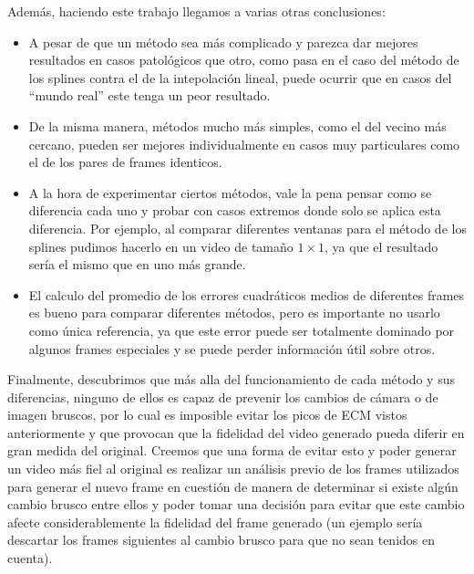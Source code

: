 \vspace{1em}

Adem\'as, haciendo este trabajo llegamos a varias otras conclusiones:

\vspace{-2ex}

\begin{itemize}
	\item A pesar de que un m\'etodo sea m\'as complicado y parezca dar mejores resultados en casos patol\'ogicos que otro, como pasa en el caso del m\'etodo de los splines contra el de la intepolaci\'on lineal, puede ocurrir que en casos del ``mundo real'' este tenga un peor resultado.
	\item De la misma manera, m\'etodos mucho m\'as simples, como el del vecino m\'as cercano, pueden ser mejores individualmente en casos muy particulares como el de los pares de frames identicos.
	\item A la hora de experimentar ciertos m\'etodos, vale la pena pensar como se diferencia cada uno y probar con casos extremos donde solo se aplica esta diferencia. Por ejemplo, al comparar diferentes ventanas para el m\'etodo de los splines pudimos hacerlo en un video de tama\~no \(1 \times 1\), ya que el resultado ser\'ia el mismo que en uno m\'as grande.
	\item El calculo del promedio de los errores cuadr\'aticos medios de diferentes frames es bueno para comparar diferentes m\'etodos, pero es importante no usarlo como \'unica referencia, ya que este error puede ser totalmente dominado por algunos frames especiales y se puede perder informaci\'on \'util sobre otros.
\end{itemize}

Finalmente, descubrimos que m\'as alla del funcionamiento de cada m\'etodo y sus diferencias, ninguno de ellos es capaz de prevenir los cambios de c\'amara o de imagen bruscos, por lo cual es imposible evitar los picos de ECM vistos anteriormente y que provocan que la fidelidad del video generado pueda diferir en gran medida del original. Creemos que una forma de evitar esto y poder generar un video m\'as fiel al original es realizar un an\'alisis previo de los frames utilizados para generar el nuevo frame en cuesti\'on de manera de determinar si existe alg\'un cambio brusco entre ellos y poder tomar una decisi\'on para evitar que este cambio afecte considerablemente la fidelidad del frame generado (un ejemplo ser\'ia descartar los frames siguientes al cambio brusco para que no sean tenidos en cuenta).

